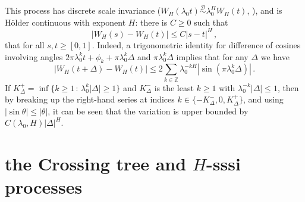 \documentclass[a4paper]{article}
\newcommand{\Dcal}{\mathcal{D}}
\begin{document}
This process has discrete scale invariance ($W_H(\lambda_0 t) \overset{\Dcal}{\sim} \lambda_0^H W_H(t)$,
\cite{decrouez2015}), and is H\"older continuous with exponent $H$: there is $C \geq 0$
such that
\begin{equation} \label{eq:def_holder}
    \bigl| W_H(s) - W_H(t) \bigr| \leq C |s - t|^H \,,
\end{equation}
that for all $s,t\geq [0,1]$. Indeed, a trigonometric identity for difference of
cosines involving angles $2\pi \lambda_0^k t + \phi_k + \pi \lambda_0^k \Delta$
and $\pi \lambda_0^k \Delta$ implies that for any $\Delta$ we have
\begin{equation*}
    \bigl| W_H(t+\Delta) - W_H(t) \bigr|
        \leq 2 \sum_{k\in \mathbb{Z}} \lambda_0^{-k H} |\sin(\pi \lambda_0^k \Delta)| \,.
\end{equation*}
If $K^+_\Delta = \inf\{k\geq 1\,:\, \lambda_0^k |\Delta| \geq 1\}$ and $K^-_\Delta$
is the least $k\geq 1$ with $\lambda_0^{-k} |\Delta| \leq 1$, then by breaking up
the right-hand series at indices $k\in\{-K^-_\Delta, 0, K^+_\Delta\}$, and using
$|\sin \theta| \leq |\theta|$, it can be seen that the variation is upper bounded
by $C(\lambda_0, H) |\Delta|^H$.



\section{the Crossing tree and $H$-sssi processes} %
\label{sec:experiment}
\end{document}
